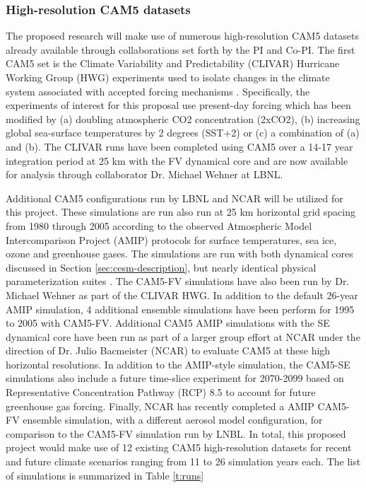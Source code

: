 \documentclass[11pt]{article}
\begin{document}
\subsubsection{High-resolution CAM5 datasets} \label{sec:CAM-data} 

The proposed research will make use of numerous high-resolution CAM5 datasets already available through collaborations set forth by the PI and Co-PI. The first CAM5 set is the Climate Variability and Predictability (CLIVAR) Hurricane Working Group (HWG) experiments used to isolate changes in the climate system associated with accepted forcing mechanisms \citep{Wehner2015}.  Specifically, the experiments of interest for this proposal use present-day forcing which has been modified by (a) doubling atmospheric CO2 concentration (2xCO2), (b) increasing global sea-surface temperatures by 2 degrees (SST+2) or (c) a combination of (a) and (b).  The CLIVAR runs have been completed using CAM5 over a 14-17 year integration period at 25 km with the FV dynamical core and are now available for analysis through collaborator Dr. Michael Wehner at LBNL.

Additional CAM5 configurations run by LBNL and NCAR will be utilized for this project. These simulations are run also run at 25 km horizontal grid spacing from 1980 through 2005 according to the observed Atmospheric Model Intercomparison Project (AMIP) protocols \citep{Gates1992,Gates1999} for surface temperatures, sea ice, ozone and greenhouse gases. The simulations are run with both dynamical cores discussed in Section \ref{sec:cesm-description}, but nearly identical physical parameterization suites \citep{RBNetal2010NCAR}. The CAM5-FV simulations have also been run by Dr. Michael Wehner as part of the CLIVAR HWG. In addition to the default 26-year AMIP simulation, 4 additional ensemble simulations have been perform for 1995 to 2005 with CAM5-FV. Additional CAM5 AMIP simulations with the SE dynamical core have been run as part of a larger group effort at NCAR under the direction of Dr. Julio Bacmeister (NCAR) to evaluate CAM5 at these high horizontal resolutions. In addition to the AMIP-style simulation, the CAM5-SE simulations also include a future time-slice experiment for 2070-2099 based on Representative Concentration Pathway (RCP) 8.5 to account for future greenhouse gas forcing. Finally, NCAR has recently completed a AMIP CAM5-FV ensemble simulation, with a different aerosol model configuration, for comparison to the CAM5-FV simulation run by LNBL.  In total, this proposed project would make use of 12 existing CAM5 high-resolution datasets for recent and future climate scenarios ranging from 11 to 26 simulation years each.  The list of simulations is summarized in Table \ref{t:runs}
\end{document}
